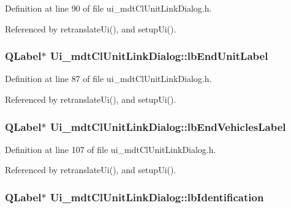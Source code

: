 Definition at line 90 of file ui\-\_\-mdt\-Cl\-Unit\-Link\-Dialog.\-h.



Referenced by retranslate\-Ui(), and setup\-Ui().

\hypertarget{class_ui__mdt_cl_unit_link_dialog_a4bbab7bc9ce1d4b4e04ae075a2e08a43}{
\subsubsection[{lb\-End\-Unit\-Label}]{\setlength{\rightskip}{0pt plus 5cm}Q\-Label$\ast$ Ui\-\_\-mdt\-Cl\-Unit\-Link\-Dialog\-::lb\-End\-Unit\-Label}}\label{class_ui__mdt_cl_unit_link_dialog_a4bbab7bc9ce1d4b4e04ae075a2e08a43}


Definition at line 87 of file ui\-\_\-mdt\-Cl\-Unit\-Link\-Dialog.\-h.



Referenced by retranslate\-Ui(), and setup\-Ui().

\hypertarget{class_ui__mdt_cl_unit_link_dialog_a4e3ea4e5df79bc7ff4cdef38eb047c14}{
\subsubsection[{lb\-End\-Vehicles\-Label}]{\setlength{\rightskip}{0pt plus 5cm}Q\-Label$\ast$ Ui\-\_\-mdt\-Cl\-Unit\-Link\-Dialog\-::lb\-End\-Vehicles\-Label}}\label{class_ui__mdt_cl_unit_link_dialog_a4e3ea4e5df79bc7ff4cdef38eb047c14}


Definition at line 107 of file ui\-\_\-mdt\-Cl\-Unit\-Link\-Dialog.\-h.



Referenced by retranslate\-Ui(), and setup\-Ui().

\hypertarget{class_ui__mdt_cl_unit_link_dialog_a6e0b165d599556404cb67ac1aaf09de8}{
\subsubsection[{lb\-Identification}]{\setlength{\rightskip}{0pt plus 5cm}Q\-Label$\ast$ Ui\-\_\-mdt\-Cl\-Unit\-Link\-Dialog\-::lb\-Identification}}\label{class_ui__mdt_cl_unit_link_dialog_a6e0b165d599556404cb67ac1aaf09de8}


